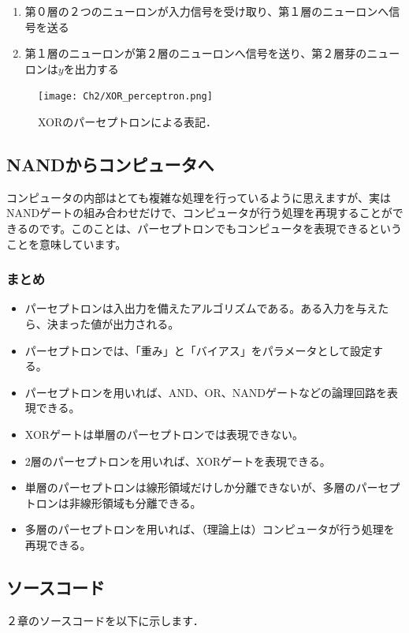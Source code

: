 \begin{enumerate}
    \item 第０層の２つのニューロンが入力信号を受け取り、第１層のニューロンへ信号を送る 
    \item 第１層のニューロンが第２層のニューロンへ信号を送り、第２層芽のニューロンは$y$を出力する
\end{enumerate}

\begin{figure}[h]
  \vspace{0mm}
  \begin{center}
    \hspace{0mm}
    \centering
    \texttt{[image: Ch2/XOR\_perceptron.png]} \
    \vspace{0mm}
    \caption{XORのパーセプトロンによる表記．}
    \label{fig:2_XOR_perceptron}
  \end{center}
\end{figure}

\subsection{NANDからコンピュータへ}
コンピュータの内部はとても複雑な処理を行っているように思えますが、実はNANDゲートの組み合わせだけで、コンピュータが行う処理を再現することができるのです。このことは、パーセプトロンでもコンピュータを表現できるということを意味しています。

\subsubsection{まとめ}
\begin{mdframed}[frametitle={本章で学んだこと}]
    \begin{itemize}
        \item パーセプトロンは入出力を備えたアルゴリズムである。ある入力を与えたら、決まった値が出力される。
        \item パーセプトロンでは、「重み」と「バイアス」をパラメータとして設定する。
        \item パーセプトロンを用いれば、AND、OR、NANDゲートなどの論理回路を表現できる。
        \item XORゲートは単層のパーセプトロンでは表現できない。
        \item 2層のパーセプトロンを用いれば、XORゲートを表現できる。
        \item  単層のパーセプトロンは線形領域だけしか分離できないが、多層のパーセプトロンは非線形領域も分離できる。
        \item 多層のパーセプトロンを用いれば、（理論上は）コンピュータが行う処理を再現できる。
    \end{itemize}
\end{mdframed}

\subsection{ソースコード}
２章のソースコードを以下に示します．
